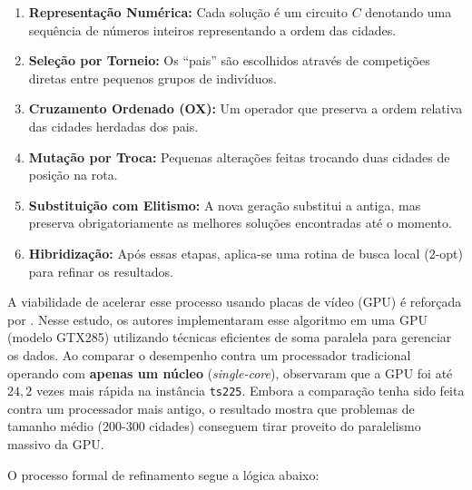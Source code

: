 \begin{enumerate}
  \def\labelenumi{\arabic{enumi}.}
  \tightlist
  \item
        \textbf{Representação Numérica:} Cada solução é um circuito \(C\)
        denotando uma sequência de números inteiros representando a ordem das
        cidades.
  \item
        \textbf{Seleção por Torneio:} Os ``pais'' são escolhidos através de
        competições diretas entre pequenos grupos de indivíduos.
  \item
        \textbf{Cruzamento Ordenado (OX):} Um operador que preserva a ordem
        relativa das cidades herdadas dos pais.
  \item
        \textbf{Mutação por Troca:} Pequenas alterações feitas trocando duas
        cidades de posição na rota.
  \item
        \textbf{Substituição com Elitismo:} A nova geração substitui a antiga,
        mas preserva obrigatoriamente as melhores soluções encontradas até o
        momento.
  \item
        \textbf{Hibridização:} Após essas etapas, aplica-se uma rotina de
        busca local (\(2\)-opt) para refinar os resultados.
\end{enumerate}

A viabilidade de acelerar esse processo usando placas de vídeo (GPU) é
reforçada por \textcite{fujimoto2011highly}. Nesse estudo, os autores
implementaram esse algoritmo em uma GPU (modelo GTX285) utilizando
técnicas eficientes de soma paralela para gerenciar os dados. Ao
comparar o desempenho contra um processador tradicional operando com
\textbf{apenas um núcleo} (\emph{single-core}), observaram que a GPU foi
até \(24{,}2\) vezes mais rápida na instância \texttt{ts225}. Embora
a comparação tenha sido feita contra um processador mais antigo, o
resultado mostra que problemas de tamanho médio (200-300 cidades)
conseguem tirar proveito do paralelismo massivo da GPU.

O processo formal de refinamento segue a lógica abaixo:

